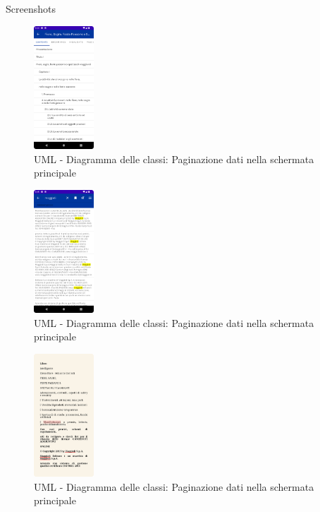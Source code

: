 \documentclass[10pt]{beamer}
\begin{document}
        \begin{frame}{Screenshots}
    \begin{multicols}{3}
        \begin{figure}[H]
        \includegraphics[width=0.2\textwidth]{toc.png}
        \caption{UML - Diagramma delle classi: Paginazione dati nella schermata principale}
        \label{toc}
        \end{figure}
        
                \begin{figure}[H]
        \includegraphics[width=0.2\textwidth]{ricerca_testo.png}
        \caption{UML - Diagramma delle classi: Paginazione dati nella schermata principale}
        \label{ricerca_testo}
        \end{figure}
        
                        \begin{figure}[H]
        \includegraphics[width=0.2\textwidth]{ricerca_testo2.png}
        \caption{UML - Diagramma delle classi: Paginazione dati nella schermata principale}
        \label{ricerca_testo2}
        \end{figure}
        \end{multicols}
    \end{frame}
\end{document}
